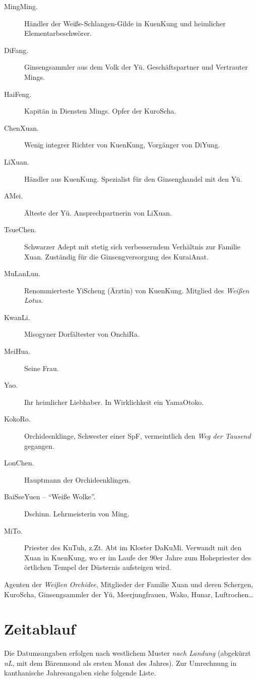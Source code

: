 \documentclass[
a4paper,
twoside,
DIV=calc,
BCOR=4mm,
fontsize=9pt,
twocolumn=on,
titlepage=on,
parskip=half
]{scrartcl}
\begin{document}
\begin{description}
\item[MingMing.] Händler der Weiße-Schlangen-Gilde in KuenKung und
  heimlicher Elementarbeschwörer.
\item[DiFang.] Ginsengsammler aus dem Volk der Yü. Geschäftspartner
  und Vertrauter Mings.
\item[HaiFeng.] Kapitän in Diensten Mings. Opfer der KuroScha.
\item[ChenXuan.] Wenig integrer Richter von KuenKung, Vorgänger von
  DiYung.
\item[LiXuan.] Händler aus KuenKung. Spezialist für den
  Ginsenghandel mit den Yü.
\item[AMei.] Älteste der Yü. Ansprechpartnerin von LiXuan.
\item[TsueChen.] Schwarzer Adept mit stetig sich verbesserndem
  Verhältnis zur Familie Xuan. Zuständig für die Ginsengversorgung
  des KuraiAnat.
\item[MuLanLun.] Renommierteste YiScheng (Ärztin) von
  KuenKung. Mitglied des \emph{Weißen Lotus}.
\item[KwanLi.] Misogyner Dorfältester von OnchiRa.
\item[MeiHua.] Seine Frau.
\item[Yao.] Ihr heimlicher Liebhaber. In Wirklichkeit ein YamaOtoko.
\item[KokoRo.] Orchideenklinge, Schwester einer SpF, vermeintlich
  den \emph{Weg der Tausend} gegangen.
\item[LonChen.] Hauptmann der Orchideenklingen.
\item[BaiSseYuen -- "`Weiße Wolke"'.] Dschinn. Lehrmeisterin von Ming.
\item[MiTo.] Priester des KuTuh, z.Zt. Abt im Kloster DaKuMi. Verwandt
  mit den Xuan in KuenKung, wo er im Laufe der 90er Jahre zum
  Hohepriester des örtlichen Tempel der Düsternis aufsteigen wird.
\end{description}

Agenten der \emph{Weißen Orchidee}, Mitglieder der Familie Xuan und
deren Schergen, KuroScha, Ginsengsammler der Yü, Meerjungfrauen, Wako,
Hunar, Luftrochen\dots

\section{Zeitablauf}

Die Datumsangaben erfolgen nach westlichem Muster \emph{nach Landung}
(abgekürzt \emph{nL}, mit dem Bärenmond als ersten Monat des
Jahres). Zur Umrechnung in kanthanische Jahresangaben siehe folgende
Liste.
\end{document}
